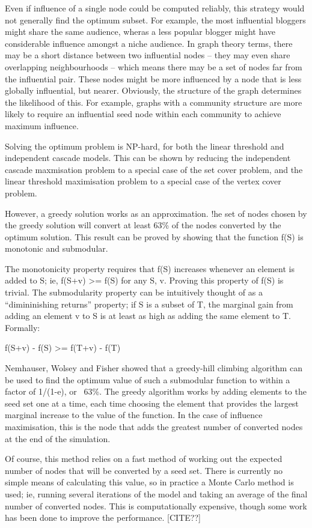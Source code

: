 Even if influence of a single node could be computed reliably, this strategy would not generally find the optimum subset. For example, the most influential bloggers might share the same audience, wheras a less popular blogger might have considerable influence amongst a niche audience. In graph theory terms, there may be a short distance between two influential nodes -- they may even share overlapping neighbourhoods -- which means there may be a set of nodes far from the influential pair. These nodes might be more influenced by a node that is less globally influential, but nearer. Obviously, the structure of the graph determines the likelihood of this. For example, graphs with a community structure are more likely to require an influential seed node within each community to achieve maximum influence.

Solving the optimum problem is NP-hard, for both the linear threshold and independent cascade models. This can be shown by reducing the independent cascade maxmisation problem to a special case of the set cover problem, and the linear threshold maximisation problem to a special case of the vertex cover problem.

However, a greedy solution works as an approximation. !he set of nodes chosen by the greedy solution will convert at least 63\% of the nodes converted by the optimum solution. This result can be proved by showing that the function f(S) is monotonic and submodular.

The monotonicity property requires that f(S) increases whenever an element is added to S; ie, f(S+v) >= f(S) for any S, v. Proving this property of f(S) is trivial. The submodularity property can be intuitively thought of as a ``dimininishing returns'' property; if S is a subset of T, the marginal gain from adding an element v to S is at least as high as adding the same element to T. Formally:

f(S+v) - f(S) >= f(T+v) - f(T)

Nemhauser, Wolsey and Fisher showed that a greedy-hill climbing algorithm can be used to find the optimum value of such a submodular function to within a factor of 1/(1-e), or ~63\%. The greedy algorithm works by adding elements to the seed set one at a time, each time choosing the element that provides the largest marginal increase to the value of the function. In the case of influence maximisation, this is the node that adds the greatest number of converted nodes at the end of the simulation.

Of course, this method relies on a fast method of working out the expected number of nodes that will be converted by a seed set. There is currently no simple means of calculating this value, so in practice a Monte Carlo method is used; ie, running several iterations of the model and taking an average of the final number of converted nodes. This is computationally expensive, though some work has been done to improve the performance. [CITE??]

